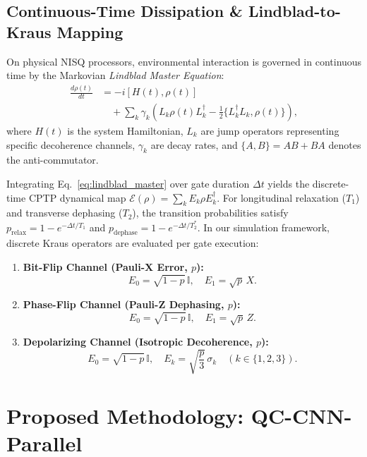 \documentclass[journal]{IEEEtran}
\begin{document}
\subsection{Continuous-Time Dissipation & Lindblad-to-Kraus Mapping}
On physical NISQ processors, environmental interaction is governed in continuous time by the Markovian \textit{Lindblad Master Equation}:
\begin{align}
\frac{d\rho(t)}{dt} &= -i [H(t), \rho(t)] \nonumber \\
&\quad + \sum_{k} \gamma_k \left( L_k \rho(t) L_k^\dagger - \frac{1}{2} \{L_k^\dagger L_k, \rho(t)\} \right),
\label{eq:lindblad_master}
\end{align}
where $H(t)$ is the system Hamiltonian, $L_k$ are jump operators representing specific decoherence channels, $\gamma_k$ are decay rates, and $\{A, B\} = AB + BA$ denotes the anti-commutator.

Integrating Eq.~\eqref{eq:lindblad_master} over gate duration $\Delta t$ yields the discrete-time CPTP dynamical map $\mathcal{E}(\rho) = \sum_k E_k \rho E_k^\dagger$. For longitudinal relaxation ($T_1$) and transverse dephasing ($T_2$), the transition probabilities satisfy $p_{\mathrm{relax}} = 1 - e^{-\Delta t / T_1}$ and $p_{\mathrm{dephase}} = 1 - e^{-\Delta t / T_2^*}$. In our simulation framework, discrete Kraus operators are evaluated per gate execution:
\begin{enumerate}
    \item \textbf{Bit-Flip Channel (Pauli-X Error, $p$):}
    \begin{equation}
    E_0 = \sqrt{1 - p} \, \mathbb{I}, \quad E_1 = \sqrt{p} \, X.
    \label{eq:kraus_bitflip}
    \end{equation}
    \item \textbf{Phase-Flip Channel (Pauli-Z Dephasing, $p$):}
    \begin{equation}
    E_0 = \sqrt{1 - p} \, \mathbb{I}, \quad E_1 = \sqrt{p} \, Z.
    \label{eq:kraus_phaseflip}
    \end{equation}
    \item \textbf{Depolarizing Channel (Isotropic Decoherence, $p$):}
    \begin{equation}
    E_0 = \sqrt{1 - p} \, \mathbb{I}, \quad E_k = \sqrt{\frac{p}{3}} \, \sigma_k \quad (k \in \{1, 2, 3\}).
    \label{eq:kraus_depolarizing}
    \end{equation}
\end{enumerate}

\section{Proposed Methodology: QC-CNN-Parallel}
\label{sec:methodology}
\end{document}
